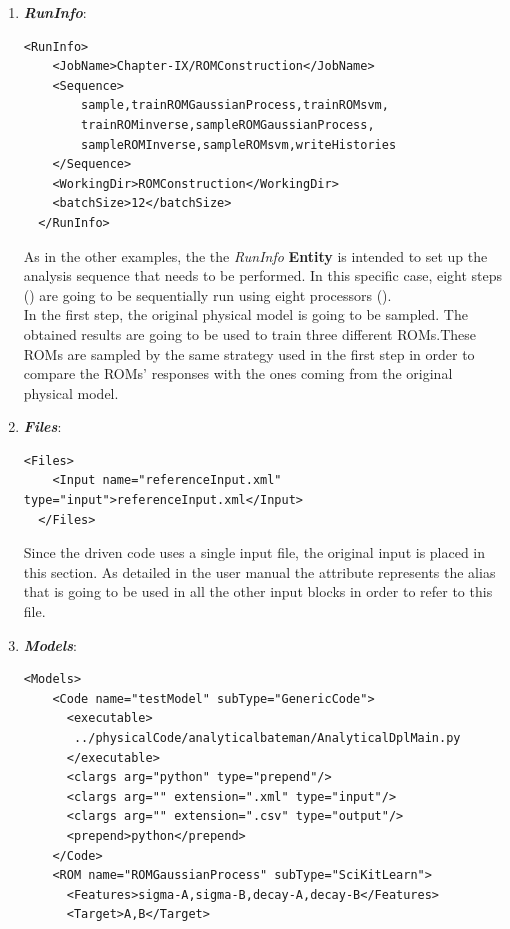 \begin{enumerate}
   \item \textbf{\textit{RunInfo}}:
\begin{lstlisting}[style=XML,morekeywords={arg,extension,pauseAtEnd,overwrite}]
  <RunInfo>
    <JobName>Chapter-IX/ROMConstruction</JobName>
    <Sequence>
        sample,trainROMGaussianProcess,trainROMsvm,
        trainROMinverse,sampleROMGaussianProcess,
        sampleROMInverse,sampleROMsvm,writeHistories
    </Sequence>
    <WorkingDir>ROMConstruction</WorkingDir>
    <batchSize>12</batchSize>
  </RunInfo>
\end{lstlisting}
   As in the other examples, the the \textit{RunInfo} \textbf{Entity} is intended  to set up the analysis sequence that
   needs to be performed. In this specific case, eight steps  () are going to be sequentially run 
   using eight processors (). 
   \\In the first step, the original physical model is going to be sampled. The obtained results are going to be used to
   train three different ROMs.These ROMs are sampled by the same strategy used in the first step in order to compare the
   ROMs' responses with the ones coming from the original physical model.
   \item \textbf{\textit{Files}}:
\begin{lstlisting}[style=XML,morekeywords={arg,extension,pauseAtEnd,overwrite}]
  <Files>
    <Input name="referenceInput.xml" type="input">referenceInput.xml</Input>
  </Files>
\end{lstlisting}
   Since the driven code uses a single input file, the original input is placed in this section. As detailed in the user manual
   the attribute   represents the alias that is going to be 
   used in all the other input blocks in order to refer to this file. 
   \item \textbf{\textit{Models}}:
\begin{lstlisting}[style=XML,morekeywords={arg,extension,pauseAtEnd,overwrite}]
  <Models>
    <Code name="testModel" subType="GenericCode">
      <executable>
       ../physicalCode/analyticalbateman/AnalyticalDplMain.py
      </executable>
      <clargs arg="python" type="prepend"/>
      <clargs arg="" extension=".xml" type="input"/>
      <clargs arg="" extension=".csv" type="output"/>
      <prepend>python</prepend>
    </Code>
    <ROM name="ROMGaussianProcess" subType="SciKitLearn">
      <Features>sigma-A,sigma-B,decay-A,decay-B</Features>
      <Target>A,B</Target>

\end{lstlisting}
\end{enumerate}

